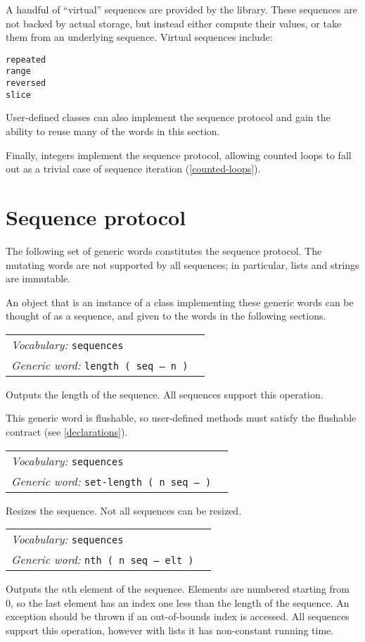 \documentclass{book}
\newcommand{\vocabulary}[1]{\emph{Vocabulary:} \texttt{#1}&\\}
\newcommand{\genericword}[2]{\index{\texttt{#1}}\emph{Generic word:} \texttt{#2}&\\}
\newcommand{\wordtable}[1]{


\begin{tabularx}{12cm}{lX}
\hline
#1
\hline
\end{tabularx}

}
\begin{document}
A handful of ``virtual'' sequences are provided by the library. These sequences are not backed by actual storage, but instead either compute their values, or take them from an underlying sequence. Virtual sequences include:
\begin{verbatim}
repeated
range
reversed
slice
\end{verbatim}
User-defined classes can also implement the sequence protocol and gain the ability to reuse many of the words in this section.

Finally, integers implement the sequence protocol, allowing counted loops to fall out as a trivial case of sequence iteration (\ref{counted-loops}).


\section{Sequence protocol}

The following set of generic words constitutes the sequence protocol. The mutating words are not supported by all sequences; in particular, lists and strings are immutable.

An object that is an instance of a class implementing these generic words can be thought of as a sequence, and given to the words in the following sections.

\wordtable{
\vocabulary{sequences}
\genericword{length}{length ( seq -- n )}
}
Outputs the length of the sequence. All sequences support this operation.

This generic word is flushable, so user-defined methods must satisfy the flushable contract (see \ref{declarations}).
\wordtable{
\vocabulary{sequences}
\genericword{set-length}{set-length ( n seq -- )}
}
Resizes the sequence. Not all sequences can be resized.

\wordtable{
\vocabulary{sequences}
\genericword{nth}{nth ( n seq -- elt )}
}
Outputs the $n$th element of the sequence. Elements are numbered starting from 0, so the last element has an index one less than the length of the sequence. An exception should be thrown if an out-of-bounds index is accessed. All sequences support this operation, however with lists it has non-constant running time.
\end{document}
